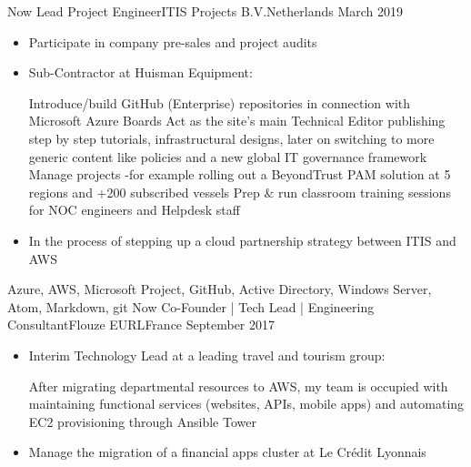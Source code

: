 %
%
%
\begin{experiences}
  \experience
    {Now}           {Lead Project Engineer}{ITIS Projects B.V.}{Netherlands}
    {March 2019}    {
                      \begin{itemize}
                        \item Participate in company pre-sales and project audits                        
                        \item Sub-Contractor at Huisman Equipment:
                        
                        \linebreak Introduce/build GitHub (Enterprise) repositories in connection with Microsoft Azure Boards
                        \linebreak Act as the site's main Technical Editor publishing step by step tutorials, infrastructural designs, later on switching to more generic content like policies and a new global IT governance framework
                        \linebreak Manage projects -for example rolling out a BeyondTrust PAM solution at 5 regions and +200 subscribed vessels
                        \linebreak Prep \& run classroom training sessions for NOC engineers and Helpdesk staff
                        
                        \item In the process of stepping up a cloud partnership strategy between ITIS and AWS           
                      \end{itemize}
                    }
                    {Azure, AWS, Microsoft Project, GitHub, Active Directory, Windows Server, Atom, Markdown, git}
  \emptySeparator
  \experience
    {Now}           {Co-Founder | Tech Lead | Engineering Consultant}{Flouze EURL}{France}
    {September 2017}{
                      \begin{itemize}
                        \item Interim Technology Lead at a leading travel and tourism group: 
                        
                        \linebreak After migrating departmental resources to AWS, my team is occupied with maintaining functional services (websites, APIs, mobile apps) and automating EC2 provisioning through Ansible Tower                           
                        \item Manage the migration of a financial apps cluster at Le Crédit Lyonnais                       


\end{itemize}}
\end{experiences}
